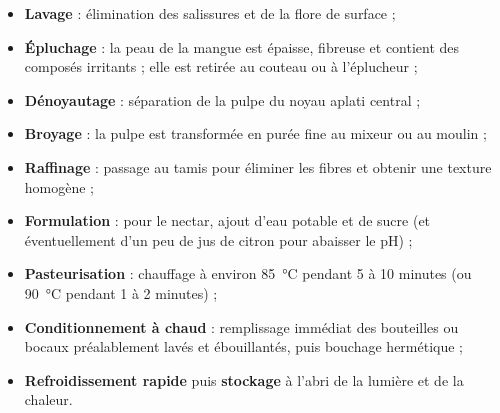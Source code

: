 \documentclass[11pt]{article}
\begin{document}
\begin{itemize}
\item \textbf{Lavage} : élimination des salissures et de la flore de surface ;
\item \textbf{Épluchage} : la peau de la mangue est épaisse, fibreuse et contient des composés irritants ; elle est retirée au couteau ou à l'éplucheur ;
\item \textbf{Dénoyautage} : séparation de la pulpe du noyau aplati central ;
\item \textbf{Broyage} : la pulpe est transformée en purée fine au mixeur ou au moulin ;
\item \textbf{Raffinage} : passage au tamis pour éliminer les fibres et obtenir une texture homogène ;
\item \textbf{Formulation} : pour le nectar, ajout d'eau potable et de sucre (et éventuellement d'un peu de jus de citron pour abaisser le pH) ;
\item \textbf{Pasteurisation} : chauffage à environ \SI{85}{\celsius} pendant 5 à 10 minutes (ou \SI{90}{\celsius} pendant 1 à 2 minutes) ;
\item \textbf{Conditionnement à chaud} : remplissage immédiat des bouteilles ou bocaux préalablement lavés et ébouillantés, puis bouchage hermétique ;
\item \textbf{Refroidissement rapide} puis \textbf{stockage} à l'abri de la lumière et de la chaleur.
\end{itemize}
\end{document}
